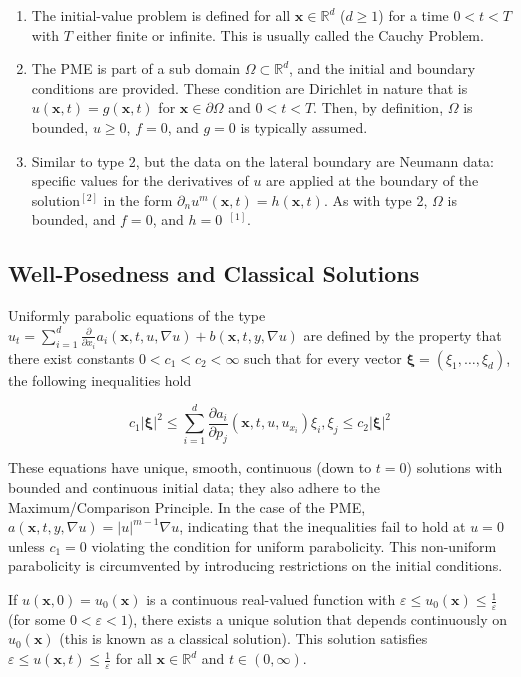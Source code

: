 \documentclass[paper=a4, fontsize=12pt]{scrartcl} %
\numberwithin{equation}{section} %
\numberwithin{table}{section} %
\begin{document}
\begin{enumerate}
	\item  The initial-value problem is defined for all $\mathbf{x}\in \mathbb{R}^d$ ($d \geq 1$) for a time $0<t<T$ with $T$ either finite or infinite. This is usually called the Cauchy Problem.
	\item The PME is part of a sub domain $\Omega \subset \mathbb{R}^d$, and the initial and boundary conditions are provided. These condition are Dirichlet in nature \textemdash that is $u(\mathbf{x},t) = g(\mathbf{x},t)$ for $\mathbf{x} \in \partial\Omega$ and $0<t<T$. Then, by definition, $\Omega$ is bounded, $u \geq 0$, $f=0$, and $g = 0$ is typically assumed.
	\item Similar to type 2, but the data on the lateral boundary are Neumann data: specific values for the derivatives of $u$ are applied at the boundary of the solution$^{[2]}$ in the form $\partial_n u^m(\mathbf{x},t) = h(\mathbf{x},t)$. As with type 2,  $\Omega$ is bounded, and $f=0$, and $h=0 ~~^{[1]}$.
\end{enumerate} 

\subsection{Well-Posedness and Classical Solutions}
Uniformly parabolic equations of the type $u_t = \sum_{i=1}^d \frac{\partial}{\partial x_i}a_i(\mathbf{x}, t, u , \nabla u) + b(\mathbf{x}, t, y, \nabla u)$ are defined by the property that there exist constants $0< c_1 < c_2 < \infty$ such that for every vector $\mathbf{\xi}= (\xi_1, \dots, \xi_d)$, the following inequalities hold

$$c_1 |\mathbf{\xi}|^2 \le \sum_{i=1}^d \frac{\partial a_i}{\partial p_j}(\mathbf{x}, t, u, u_{x_i}) \xi_i, \xi_j \le c_2 |\mathbf{\xi}|^2$$

These equations have unique, smooth, continuous (down to $t=0$) solutions with bounded and continuous initial data; they also adhere to the Maximum/Comparison Principle. In the case of the PME, $a(\mathbf{x}, t, y, \nabla u) = |u|^{m-1} \nabla u$, indicating that the inequalities fail to hold at $u=0$ unless $c_1=0$ \textemdash violating the condition for uniform parabolicity. This non-uniform parabolicity is circumvented by introducing restrictions on the initial conditions.


If $u(\mathbf{x},0)= u_0(\mathbf{x})$ is a continuous real-valued function with $\varepsilon \le u_0(\mathbf{x}) \le \frac{1}{\varepsilon}$ (for some $0 < \varepsilon < 1$), there exists a unique solution that depends continuously on $u_0(\mathbf{x})$ (this is known as a classical solution). This solution satisfies $\varepsilon \le u(\mathbf{x},t) \le \frac{1}{\varepsilon}$ for all $\mathbf{x} \in \mathbb{R}^d$ and $t \in (0, \infty)$. 
\end{document}
